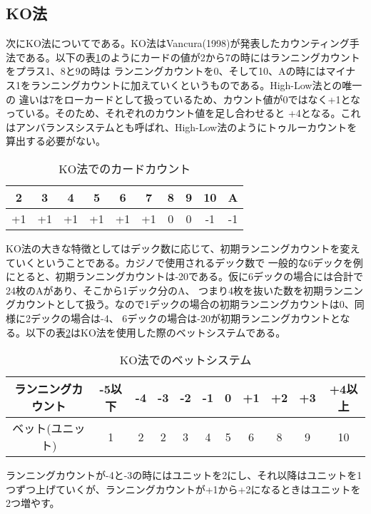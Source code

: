 \subsection{KO法}
次にKO法についてである。KO法はVancura(1998)が発表したカウンティング手法である。以下の表\ref{koc}のようにカードの値が2から7の時にはランニングカウントをプラス1、8と9の時は
ランニングカウントを0、そして10、Aの時にはマイナス1をランニングカウントに加えていくというものである。High-Low法との唯一の
違いは7をローカードとして扱っているため、カウント値が0ではなく+1となっている。そのため、それぞれのカウント値を足し合わせると
+4となる。これはアンバランスシステムとも呼ばれ、High-Low法のようにトゥルーカウントを算出する必要がない。
  \begin{table}[H]
    \centering
    \label{koc}
    \caption{KO法でのカードカウント}
    \begin{tabular}{|c|c|c|c|c|c|c|c|c|c|} \hline
      2&3&4&5&6&7&8&9&10&A \\ \hline
      +1&+1&+1&+1&+1&+1&0&0&-1&-1 \\ \hline
    \end{tabular}
  \end{table}
  
KO法の大きな特徴としてはデック数に応じて、初期ランニングカウントを変えていくということである。カジノで使用されるデック数で
一般的な6デックを例にとると、初期ランニングカウントは-20である。仮に6デックの場合には合計で24枚のAがあり、そこから1デック分のA、
つまり4枚を抜いた数を初期ランニングカウントとして扱う。なので1デックの場合の初期ランニングカウントは0、同様に2デックの場合は-4、
6デックの場合は-20が初期ランニングカウントとなる。以下の表\ref{kob}はKO法を使用した際のベットシステムである。

  \begin{table}[H]
    \centering
    \label{kob}
    \caption{KO法でのベットシステム}
    \begin{tabular}{|c|c|c|c|c|c|c|c|c|c|c|} \hline
      ランニングカウント&-5以下&-4&-3&-2&-1&0&+1&+2&+3&+4以上 \\ \hline
      ベット(ユニット)&1&2&2&3&4&5&6&8&9&10 \\ \hline
    \end{tabular}
  \end{table}
ランニングカウントが-4と-3の時にはユニットを2にし、それ以降はユニットを1つずつ上げていくが、ランニングカウントが+1から+2になるときはユニットを2つ増やす。
